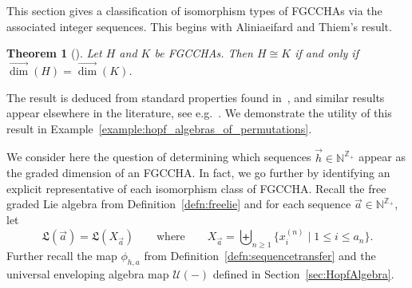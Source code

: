 \documentclass[11pt]{amsart}
\newtheorem{theorem}{Theorem}[section]
\theoremstyle{definition}
\numberwithin{equation}{section}
\def\NN{{\mathbb N}}
\def\ZZ{{\mathbb Z}}
\newcommand{\FGCCHA}{\textsf{FGCCHA}\xspace}
\newcommand{\FGCCHAs}{\textsf{FGCCHA}s\xspace}
\newcommand{\vecdim}{\overrightarrow{\dim}}
\newcommand{\lucas}[1]{\todo[size=\tiny,color=red!50]{#1 \\ \hfill --- Lucas}}
\begin{document}
This section gives a classification of isomorphism types of \FGCCHAs via the associated integer sequences.  
This begins with Aliniaeifard and Thiem's result.

\begin{theorem}[{\cite[Theorem 12]{AT22}}]
\label{thm:AT}
Let $H$ and $K$ be \FGCCHAs.  Then $H \cong K$ if and only if $\vecdim(H) = \vecdim(K)$.
\end{theorem}

The result is deduced from standard properties found in~\cite[Section 4.1]{L08}, and similar results appear elsewhere in the literature, see e.g.~\cite[Prop.~1.4]{AS05cc}.  We demonstrate the utility of this result in Example~\ref{example:hopf_algebras_of_permutations}.


We consider here the question of determining which sequences $\vec{h} \in \NN^{\ZZ_+}$
appear as the graded dimension of an \FGCCHA.  In fact,
we go further by identifying an explicit representative of each isomorphism class of \FGCCHA.  
Recall the free graded Lie algebra from Definition~\ref{defn:freelie} and for each sequence $\vec{a} \in \NN^{\ZZ_{+}}$, let
\begin{equation}
\label{eq:La}
\mathfrak{L}(\vec{a}) = \mathfrak{L}(X_{\vec{a}}) \qquad\text{where}\qquad X_{\vec{a}} = \biguplus_{n \ge 1} \{x^{(n)}_{i} \;|\; 1 \le i \le a_{n}\}.
\end{equation}
Further recall the map $\phi_{h, a}$ from
Definition~\ref{defn:sequencetransfer} and the universal enveloping
algebra map $\mathcal{U}(-)$ defined in Section~\ref{sec:HopfAlgebra}.
\end{document}
